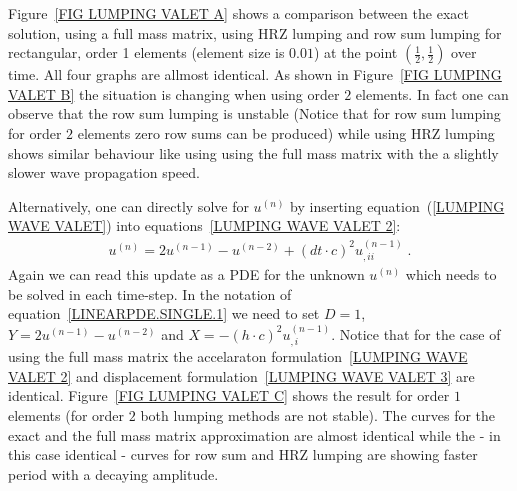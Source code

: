 Figure~\ref{FIG LUMPING VALET A} shows a comparison between 
the exact solution, using a full mass matrix, using HRZ lumping and row sum lumping
for rectangular, order 1 elements (element size is $0.01$) at the point $(\frac{1}{2},\frac{1}{2})$
over time. All four graphs are allmost identical. As shown in
Figure~\ref{FIG LUMPING VALET B} the situation is changing when using order $2$ elements. 
In fact one can observe that the row sum lumping is unstable (Notice that for 
row sum lumping for order $2$ elements zero row sums can be produced) while using HRZ lumping 
shows similar behaviour like using using the full mass matrix with the a
slightly slower wave propagation speed.

Alternatively, one can directly solve for $u^{(n)}$ by inserting equation~(\ref{LUMPING WAVE VALET})
into equations~\ref{LUMPING WAVE VALET 2}:
\begin{eqnarray} \label{LUMPING WAVE VALET 3} 
u^{(n)}=2u^{(n-1)}-u^{(n-2)} + (dt\cdot c)^2 u^{(n-1)}_{,ii} \; .
\end{eqnarray}
Again we can read this update as a PDE for the unknown $u^{(n)}$ which needs to be solved in each time-step. 
In the notation of equation~\ref{LINEARPDE.SINGLE.1} we need to set $D=1$, $Y=2u^{(n-1)}-u^{(n-2)}$ and 
$X=-(h\cdot c)^2 u^{(n-1)}_{,i}$. Notice that for the case of using the full mass matrix 
the accelaraton formulation~\ref{LUMPING WAVE VALET 2} and displacement formulation~\ref{LUMPING WAVE VALET 3}
are identical. Figure~\ref{FIG LUMPING VALET C} shows the result for order $1$ elements (for order $2$ both 
lumping methods are not stable). The curves for the exact and the full mass matrix approximation
are almost identical while the - in this case identical - curves for row sum and 
HRZ lumping are showing faster period with a decaying amplitude.


